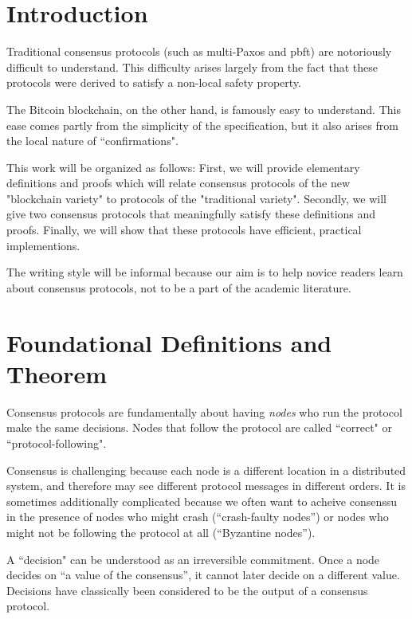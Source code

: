 \documentclass{article}
\theoremstyle{definition}
\begin{document}
\iffalse



\section{Introduction}
Traditional consensus protocols (such as multi-Paxos and pbft) are notoriously difficult to understand. This difficulty arises largely from the fact that these protocols were derived to satisfy a non-local safety property.

The Bitcoin blockchain, on the other hand, is famously easy to understand. This ease comes partly from the simplicity of the specification, but it also arises from the local nature of ``confirmations".

This work will be organized as follows: First, we will provide elementary definitions and proofs which will relate consensus protocols of the new "blockchain variety" to protocols of the "traditional variety". Secondly, we will give two consensus protocols that meaningfully satisfy these definitions and proofs. Finally, we will show that these protocols have efficient, practical implementions.

The writing style will be informal because our aim is to help novice readers learn about consensus protocols, not to be a part of the academic literature.

\section{Foundational Definitions and Theorem}

Consensus protocols are fundamentally about having \emph{nodes} who run the protocol make the same decisions. Nodes that follow the protocol are called ``correct" or ``protocol-following".

Consensus is challenging because each node is a different location in a distributed system, and therefore may see different protocol messages in different orders. It is sometimes additionally complicated because we often want to acheive consenssu in the presence of nodes who might crash (``crash-faulty nodes'') or nodes who might not be following the protocol at all (``Byzantine nodes'').

A ``decision" can be understood as an irreversible commitment. Once a node decides on ``a value of the consensus'', it cannot later decide on a different value. Decisions have classically been considered to be the output of a consensus protocol.
\end{document}
